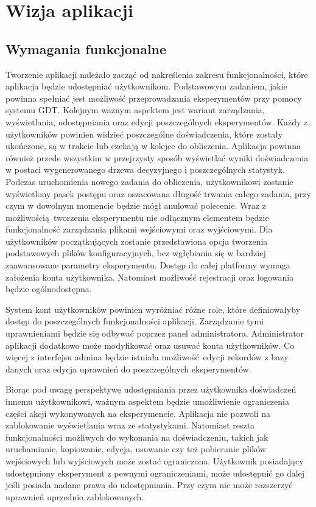 \chapter{Wizja aplikacji}

\section{Wymagania funkcjonalne}
Tworzenie aplikacji należało zacząć od nakreślenia zakresu funkcjonalności, które aplikacja będzie udostępniać użytkownikom. Podstawowym zadaniem, jakie powinna spełniać jest możliwość przeprowadzania eksperymentów przy pomocy systemu GDT. Kolejnym ważnym aspektem jest wariant zarządzania, wyświetlania, udostępniania oraz edycji poszczególnych eksperymentów. Każdy z użytkowników powinien widzieć poszczególne doświadczenia, które zostały ukończone, są w trakcie lub czekają w kolejce do obliczenia. Aplikacja powinna również przede wszystkim w przejrzysty sposób wyświetlać wyniki doświadczenia w postaci wygenerowanego drzewa decyzyjnego i poszczególnych statystyk. Podczas uruchomienia nowego zadania do obliczenia, użytkownikowi zostanie wyświetlony pasek postępu oraz oszacowana długość trwania całego zadania, przy czym w dowolnym momencie będzie mógł anulować polecenie.  Wraz z możliwością tworzenia eksperymentu nie odłącznym elementem będzie funkcjonalność zarządzania plikami wejściowymi oraz wyjściowymi. Dla użytkowników początkujących zostanie przedstawiona opcja tworzenia podstawowych plików konfiguracyjnych, bez wgłębiania się w bardziej zaawansowane parametry eksperymentu. Dostęp do całej platformy wymaga założenia konta użytkownika. Natomiast możliwość rejestracji oraz logowania będzie ogólnodostępna.

System kont użytkowników powinien wyróżniać różne role, które definiowałyby dostęp do poszczególnych funkcjonalności aplikacji. Zarządzanie tymi uprawnieniami będzie się odbywać poprzez panel administratora. Administrator aplikacji dodatkowo może modyfikować oraz usuwać konta użytkowników. Co więcej z interfejsu admina będzie istniała możliwość edycji rekordów z bazy danych oraz edycja uprawnień do poszczególnych eksperymentów. 

Biorąc pod uwagę perspektywę udostępniania przez użytkownika doświadczeń innemu użytkownikowi, ważnym aspektem będzie umożliwienie ograniczenia części akcji wykonywanych na eksperymencie. Aplikacja nie pozwoli na zablokowanie wyświetlania wraz ze statystykami. Natomiast reszta funkcjonalności możliwych do wykonania na doświadczeniu, takich jak uruchamianie, kopiowanie, edycja, usuwanie czy też pobieranie plików wejściowych lub wyjściowych może zostać ograniczona. Użytkownik posiadający udostępniony eksperyment z pewnymi ograniczeniami, może udostępnić go dalej jeśli posiada nadane prawa do udostępniania. Przy czym nie może rozszerzyć uprawnień uprzednio zablokowanych.


